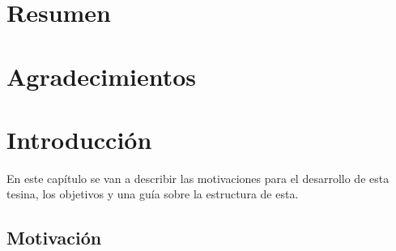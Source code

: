 \documentclass[a4paper,	11pt]{report}
\begin{document}
\titleGP
\newpage
\thispagestyle{empty}

\tableofcontents




















\chapter*{Resumen}
\label{sec:abstract}


\chapter*{Agradecimientos}
\label{sec:acknowledgment}


\chapter{Introducción}
\label{sec:introduction}
En este capítulo se van a describir las motivaciones para el desarrollo de esta tesina, los objetivos y una guía sobre la estructura de esta. 


\section{Motivación}
\label{sec:motivation}

\end{document}
